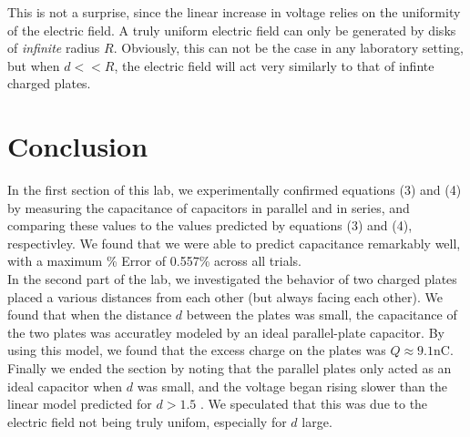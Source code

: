\documentclass[oneside,12pt]{amsart}
\begin{document}
	 \indent This is not a surprise, since the linear increase in voltage relies on the uniformity of the electric field. A truly uniform electric field can only be generated by disks of \textit{infinite} radius $R$. Obviously, this can not be the case in any laboratory setting, but when $d<<R$, the electric field will act very similarly to that of infinte charged plates.
	 
	 \section{Conclusion}
	 In the first section of this lab, we experimentally confirmed equations (3) and (4) by measuring the capacitance of capacitors in parallel and in series, and comparing these values to the values predicted by equations (3) and (4), respectivley. We found that we were able to predict capacitance remarkably well, with a maximum \% Error of 0.557\% across all trials.\\
	 
	 \indent In the second part of the lab, we investigated the behavior of two charged plates placed a various distances from each other (but always facing each other). We found that when the distance $d$ between the plates was small, the capacitance of the two plates was accuratley modeled by an ideal parallel-plate capacitor. By using this model, we found that the excess charge on the plates was $Q\approx 9.1$nC. Finally we ended the section by noting that the parallel plates only acted as an ideal capacitor when $d$ was small, and the voltage began rising slower than the linear model predicted for $d>1.5$ . We speculated that this was due to the electric field not being truly unifom, especially for $d$ large.
	
\newpage
\printbibliography
	 
	
\end{document}
